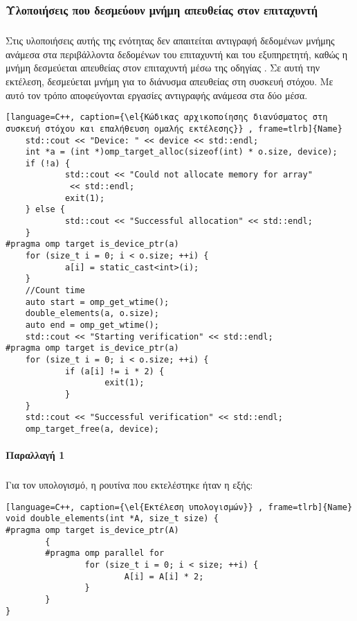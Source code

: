 \subsubsection{Υλοποιήσεις που δεσμεύουν μνήμη απευθείας στον επιταχυντή}
\subparagraph{}
Στις υλοποιήσεις αυτής της ενότητας δεν απαιτείται αντιγραφή δεδομένων μνήμης ανάμεσα στα περιβάλλοντα δεδομένων του επιταχυντή και του εξυπηρετητή, καθώς η μνήμη δεσμεύεται απευθείας στον επιταχυντή μέσω της οδηγίας \emph{}. Σε αυτή την εκτέλεση, δεσμεύεται μνήμη για το διάνυσμα απευθείας στη συσκευή στόχου. Με αυτό τον τρόπο αποφεύγονται εργασίες αντιγραφής ανάμεσα στα δύο μέσα.
\clearpage
{}
\begin{lstlisting}[language=C++, caption={\el{Κώδικας αρχικοποίησης διανύσματος στη συσκευή στόχου και επαλήθευση ομαλής εκτέλεσης}} , frame=tlrb]{Name}
    std::cout << "Device: " << device << std::endl;
    int *a = (int *)omp_target_alloc(sizeof(int) * o.size, device);
    if (!a) {
            std::cout << "Could not allocate memory for array"
             << std::endl;
            exit(1);
    } else {
            std::cout << "Successful allocation" << std::endl;
    }
#pragma omp target is_device_ptr(a)
    for (size_t i = 0; i < o.size; ++i) {
            a[i] = static_cast<int>(i);
    }
    //Count time
    auto start = omp_get_wtime();
    double_elements(a, o.size);
    auto end = omp_get_wtime();
    std::cout << "Starting verification" << std::endl;
#pragma omp target is_device_ptr(a)
    for (size_t i = 0; i < o.size; ++i) {
            if (a[i] != i * 2) {
                    exit(1);
            }
    }
    std::cout << "Successful verification" << std::endl;
    omp_target_free(a, device);
\end{lstlisting}

\clearpage
\paragraph{Παραλλαγή 1}
\subparagraph{}
Για τον υπολογισμό, η ρουτίνα που εκτελέστηκε ήταν η εξής:

\begin{lstlisting}[language=C++, caption={\el{Εκτέλεση υπολογισμών}} , frame=tlrb]{Name}
void double_elements(int *A, size_t size) {
#pragma omp target is_device_ptr(A)
        {
        #pragma omp parallel for
                for (size_t i = 0; i < size; ++i) {
                        A[i] = A[i] * 2;
                }
        }
}
\end{lstlisting}

